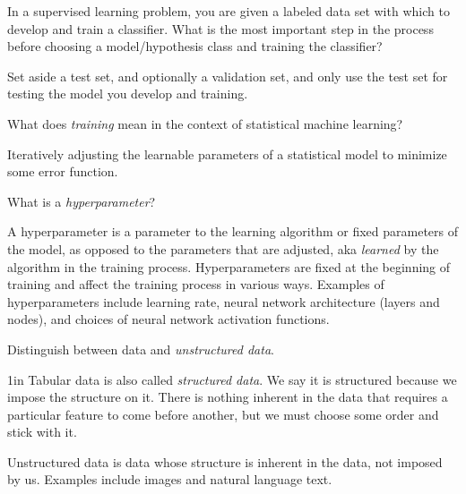 \begin{questions}

\question In a supervised learning problem, you are given a labeled data set with which to develop and train a classifier.  What is the most important step in the process before choosing a model/hypothesis class and training the classifier?

\begin{solution}[.5in]
Set aside a test set, and optionally a validation set, and only use the test set for testing the model you develop and training.
\end{solution}

\question What does {\it training} mean in the context of statistical machine learning?

\begin{solution}[.5in]
Iteratively adjusting the learnable parameters of a statistical model to minimize some error function.
\end{solution}

\question What is a {\it hyperparameter}?

\begin{solution}[.5in]
A hyperparameter is a parameter to the learning algorithm or fixed parameters of the model, as opposed to the parameters that are adjusted, aka {\it learned} by the algorithm in the training process.  Hyperparameters are fixed at the beginning of training and affect the training process in various ways.  Examples of hyperparameters include learning rate, neural network architecture (layers and nodes), and choices of neural network activation functions.
\end{solution}


\question Distinguish between {\tabular data} and {\it unstructured data}.

\begin{solution}{1in}
Tabular data is also called {\it structured data}.  We say it is structured because we impose the structure on it.  There is nothing inherent in the data that requires a particular feature to come before another, but we must choose some order and stick with it.

Unstructured data is data whose structure is inherent in the data, not imposed by us.  Examples include images and natural language text.
\end{solution}

\end{questions}


